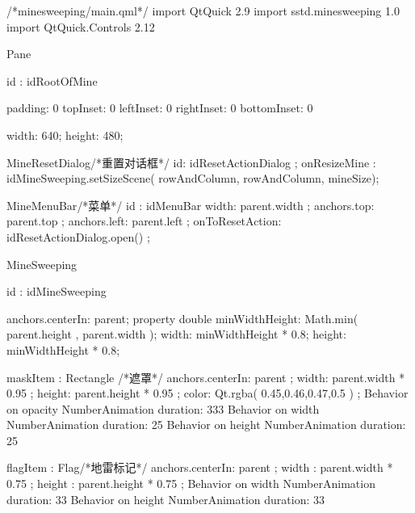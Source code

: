 \label{f000083}    %
\FloatBarrier                                  %
\begin{thebookfilesourceone}[escapeinside={(*@}{@*)},
caption=GoodLuck,
title=\filesourcenumbernameone \thefilesourcenumber
]
/*minesweeping/main.qml*/
import QtQuick 2.9
import sstd.minesweeping 1.0
import QtQuick.Controls 2.12

Pane {

    id : idRootOfMine

    padding: 0
    topInset: 0
    leftInset: 0
    rightInset: 0
    bottomInset: 0

    width: 640;
    height: 480;

    MineResetDialog{/*重置对话框*/
        id: idResetActionDialog ;
        onResizeMine : {
            idMineSweeping.setSizeScene(
                        rowAndColumn,
                        rowAndColumn,
                        mineSize);
        }
    }

    MineMenuBar{/*菜单*/
        id : idMenuBar
        width: parent.width ;
        anchors.top: parent.top ;
        anchors.left: parent.left ;
        onToResetAction: {
            idResetActionDialog.open() ;
        }
    }

    MineSweeping{

        id : idMineSweeping

        anchors.centerIn: parent;
        property double minWidthHeight:
            Math.min( parent.height , parent.width );
        width: minWidthHeight * 0.8;
        height: minWidthHeight * 0.8;

        maskItem : Rectangle {/*遮罩*/
            anchors.centerIn: parent       ;
            width: parent.width * 0.95     ;
            height: parent.height * 0.95   ;
            color: Qt.rgba( 0.45,0.46,0.47,0.5 ) ;
            Behavior on opacity{
                NumberAnimation{
                    duration: 333
                }
            }
            Behavior on width{
                NumberAnimation{
                    duration: 25
                }
            }
            Behavior on height{
                NumberAnimation{
                    duration: 25
                }
            }
        }

        flagItem : Flag{/*地雷标记*/
            anchors.centerIn: parent ;
            width  : parent.width * 0.75 ;
            height : parent.height * 0.75 ;
            Behavior on width{
                NumberAnimation{
                    duration: 33
                }
            }
            Behavior on height{
                NumberAnimation{
                    duration: 33
                }
            }
        }

}}
\end{thebookfilesourceone}
